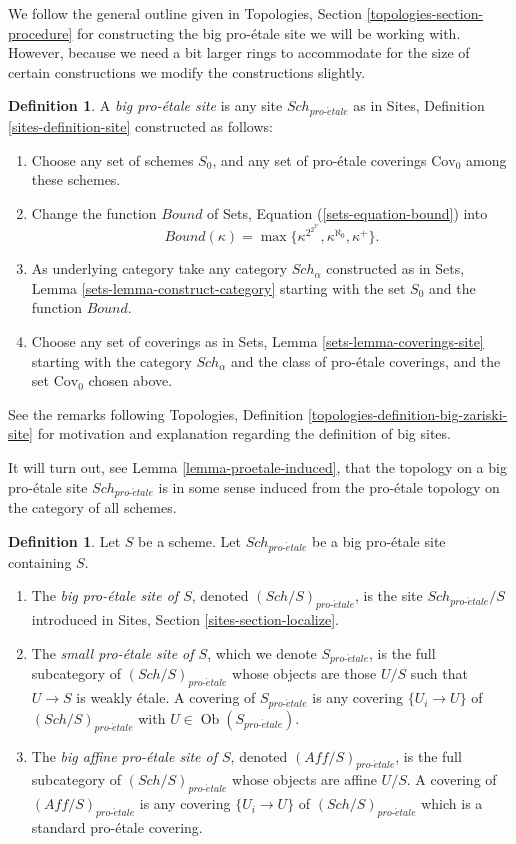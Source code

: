 \documentclass{stacks-project}
\theoremstyle{plain}
\theoremstyle{definition}
\newtheorem{definition}[subsection]{Definition}
\theoremstyle{remark}
\numberwithin{equation}{subsection}
\def\Sch{\mathit{Sch}}
\def\Ob{\mathop{\mathrm{Ob}}\nolimits}
\def\proetale{{pro\text{-}\acute{e}tale}}
\begin{document}
\noindent
We follow the general outline given in
Topologies, Section \ref{topologies-section-procedure}
for constructing the big pro-\'etale site we will be working with.
However, because we need a bit larger rings to accommodate for the size
of certain constructions we modify the constructions slightly.

\begin{definition}
\label{definition-big-proetale-site}
A {\it big pro-\'etale site} is any site $\Sch_\proetale$ as in
Sites, Definition \ref{sites-definition-site} constructed as follows:
\begin{enumerate}
\item Choose any set of schemes $S_0$, and any set of pro-\'etale coverings
$\text{Cov}_0$ among these schemes.
\item Change the function $Bound$ of
Sets, Equation (\ref{sets-equation-bound}) into
$$
Bound(\kappa) = \max\{\kappa^{2^{2^{2^\kappa}}}, \kappa^{\aleph_0}, \kappa^+\}.
$$
\item As underlying category take any category $\Sch_\alpha$
constructed as in Sets, Lemma \ref{sets-lemma-construct-category}
starting with the set $S_0$ and the function $Bound$.
\item Choose any set of coverings as in
Sets, Lemma \ref{sets-lemma-coverings-site} starting with the
category $\Sch_\alpha$ and the class of pro-\'etale coverings,
and the set $\text{Cov}_0$ chosen above.
\end{enumerate}
\end{definition}

\noindent
See the remarks following
Topologies, Definition \ref{topologies-definition-big-zariski-site}
for motivation and explanation regarding the definition of big sites.

\medskip\noindent
It will turn out, see Lemma \ref{lemma-proetale-induced}, that the
topology on a big pro-\'etale site $\Sch_\proetale$ is in some sense
induced from the pro-\'etale topology on the category of all schemes.

\begin{definition}
\label{definition-big-small-proetale}
Let $S$ be a scheme. Let $\Sch_\proetale$ be a big pro-\'etale
site containing $S$.
\begin{enumerate}
\item The {\it big pro-\'etale site of $S$}, denoted
$(\Sch/S)_\proetale$, is the site $\Sch_\proetale/S$
introduced in Sites, Section \ref{sites-section-localize}.
\item The {\it small pro-\'etale site of $S$}, which we denote
$S_\proetale$, is the full subcategory of $(\Sch/S)_\proetale$
whose objects are those $U/S$ such that $U \to S$ is weakly \'etale.
A covering of $S_\proetale$ is any covering $\{U_i \to U\}$ of
$(\Sch/S)_\proetale$ with $U \in \Ob(S_\proetale)$.
\item The {\it big affine pro-\'etale site of $S$}, denoted
$(\textit{Aff}/S)_\proetale$, is the full subcategory of
$(\Sch/S)_\proetale$ whose objects are affine $U/S$.
A covering of $(\textit{Aff}/S)_\proetale$ is any covering
$\{U_i \to U\}$ of $(\Sch/S)_\proetale$ which is a
standard pro-\'etale covering.
\end{enumerate}
\end{definition}
\end{document}
